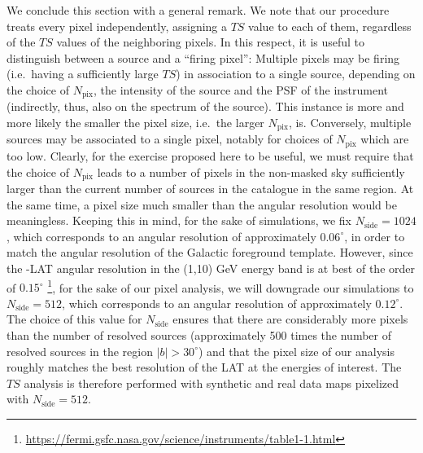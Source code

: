 \medskip
We conclude this section with a general remark. We note that our procedure treats every pixel independently, assigning a $TS$ value to each of them, regardless of the $TS$ values of the neighboring pixels. In this respect, it is  useful to distinguish between a source and a ``firing pixel'': Multiple pixels may be firing (i.e.~having a sufficiently large $TS$) in association to a single source, depending on the choice of $N_\textrm{pix}$, the intensity of the source and the PSF of the instrument (indirectly, thus, also on the spectrum of the source). This instance is more and more likely the smaller the pixel size, i.e.~the larger $N_\textrm{pix}$, is. Conversely, multiple sources may be associated to a single pixel, notably for choices of $N_\textrm{pix}$ which are too low. Clearly, for the exercise proposed here to be useful, we must require that the choice of $N_\textrm{pix}$ leads to a number of pixels in the non-masked sky sufficiently larger than the current number of sources in the catalogue in the same region. At the same time, a pixel size  much smaller than the angular resolution would be meaningless. Keeping this in mind, for the sake of simulations, we fix $N_\textrm{side}=1024$, which corresponds to an angular resolution of approximately $0.06^\circ$, in order to match the angular resolution of the Galactic foreground template. However, since the \Fermi-LAT angular resolution in the (1,10) GeV energy band is at best of the order of $0.15^\circ$ \footnote{\href{https://fermi.gsfc.nasa.gov/science/instruments/table1-1.html}{https://fermi.gsfc.nasa.gov/science/instruments/table1-1.html}}, for the sake of our pixel analysis, we will downgrade our simulations to $N_\textrm{side}=512$, which corresponds to an angular resolution of approximately $0.12^\circ$. The choice of this value for $N_\textrm{side}$ ensures that there are considerably more pixels than the number of resolved sources (approximately 500 times the number of resolved sources in the region $|b|>30^\circ$) and that the pixel size  of our analysis roughly matches the best resolution of the LAT at the energies of interest.
The $TS$ analysis is therefore performed with synthetic and real data maps pixelized with $N_\textrm{side}=512$.



